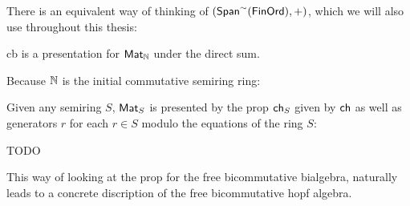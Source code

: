There is an equivalent way of thinking of $(\mathsf{Span}^{\sim}(\mathsf{FinOrd}),+)$, which we will also use throughout this thesis:

\begin{lemma}
{\sf cb} is a presentation for $\mathsf{Mat}_{\mathbb{N}}$ under the direct sum.
\end{lemma}


Because $\mathbb{N}$ is the initial commutative semiring ring:
\begin{lemma}
Given any semiring $S$, $\mathsf{Mat}_S$ is presented by the prop ${\sf ch}_S$ given by ${\sf ch}$ as well as generators $r$ for each $r \in S$ modulo the equations of the ring $S$:

TODO
\end{lemma}
This way of looking at the prop for the free bicommutative bialgebra, naturally leads to a concrete discription of the free bicommutative hopf algebra.

